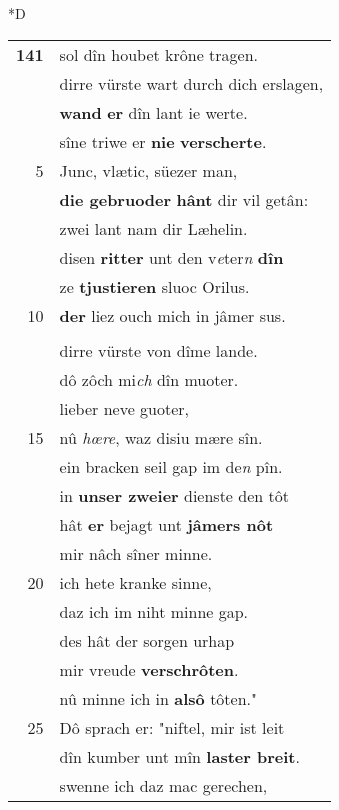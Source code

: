 \documentclass[8pt,a4paper,notitlepage]{article}
\begin{document}
\begin{table}[ht]
\begin{minipage}[t]{0.5\linewidth}
\small
\begin{center}*D
\end{center}
\begin{tabular}{rl}
\textbf{141} & sol dîn houbet krône tragen.\\ 
 & dirre vürste wart durch dich erslagen,\\ 
 & \textbf{wand} \textbf{er} dîn lant ie werte.\\ 
 & sîne triwe er \textbf{nie} \textbf{verscherte}.\\ 
5 & Junc, vlætic, süezer man,\\ 
 & \textbf{die gebruoder} \textbf{hânt} dir vil getân:\\ 
 & zwei lant nam dir Læhelin.\\ 
 & disen \textbf{ritter} unt den v\textit{e}ter\textit{n} \textbf{dîn}\\ 
 & ze \textbf{tjustieren} sluoc Orilus.\\ 
10 & \textbf{der} liez ouch mich in jâmer sus.\\ 
 & \textbf{\begin{large}D\end{large}ir} diende ân alle schande\\ 
 & dirre vürste von dîme lande.\\ 
 & dô zôch mi\textit{ch} dîn muoter.\\ 
 & lieber neve guoter,\\ 
15 & nû \textit{hœre}, waz disiu mære sîn.\\ 
 & ein bracken seil gap im de\textit{n} pîn.\\ 
 & in \textbf{unser zweier} dienste den tôt\\ 
 & hât \textbf{er} bejagt unt \textbf{jâmers nôt}\\ 
 & mir nâch sîner minne.\\ 
20 & ich hete kranke sinne,\\ 
 & daz ich im niht minne gap.\\ 
 & des hât der sorgen urhap\\ 
 & mir vreude \textbf{verschrôten}.\\ 
 & nû minne ich in \textbf{alsô} tôten."\\ 
25 & Dô sprach er: "niftel, mir ist leit\\ 
 & dîn kumber unt mîn \textbf{laster breit}.\\ 
 & swenne ich daz mac gerechen,\\ 

\end{tabular}
\end{minipage}
\end{table}
\end{document}

